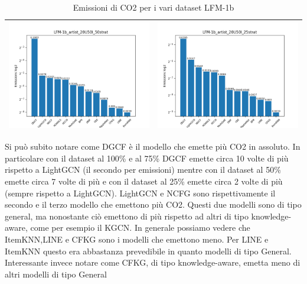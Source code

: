\begin{table}[H]
\begin{tabularx}{\textwidth}{|X|X|}
        \includegraphics[width=\linewidth, trim=0 0 0 0]{images/emissions_LFM-1b_artist_20U50I_50strat.png} &
        \includegraphics[width=\linewidth, trim=0 0 0 0]{images/emissions_LFM-1b_artist_20U50I_25strat.png} \\
        \hline
    \end{tabularx}
    \caption{Emissioni di CO2 per i vari dataset LFM-1b}
    \label{tab:emissions_info}
\end{table}

\noindent Si può subito notare come DGCF è il modello che emette più CO2 in assoluto.
In particolare con il dataset al 100\% e al 75\% DGCF emette circa 10 volte di più rispetto a LightGCN (il secondo per emissioni)
mentre con il dataset al 50\% emette circa 7 volte di più e con il dataset al 25\% emette circa 2 volte di più (sempre rispetto a LightGCN).
LightGCN e NCFG sono rispettivamente il secondo e il terzo modello che emettono più CO2.
Questi due modelli sono di tipo general, ma nonostante ciò emettono di più rispetto ad altri di tipo knowledge-aware, come per esempio il KGCN.
In generale possiamo vedere che ItemKNN,LINE e CFKG sono i modelli che emettono meno.
Per LINE e ItemKNN questo era abbastanza prevedibile in quanto modelli di tipo General. Interessante invece notare come CFKG, di tipo knowledge-aware, emetta meno di altri modelli di tipo General

